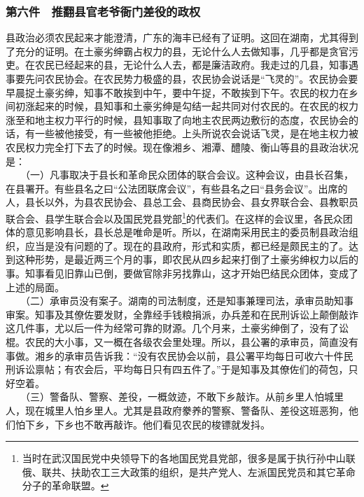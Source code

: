 \documentclass[cn,11pt,chinese]{elegantbook}
\def\myformat#1{\hfil\hfil #1}
\begin{document}
\subsubsection*{\myformat{第六件　推翻县官老爷衙门差役的政权}}
县政治必须农民起来才能澄清，广东的海丰已经有了证明。这回在湖南，尤其得到了充分的证明。在土豪劣绅霸占权力的县，无论什么人去做知事，几乎都是贪官污吏。在农民已经起来的县，无论什么人去，都是廉洁政府。我走过的几县，知事遇事要先问农民协会。在农民势力极盛的县，农民协会说话是“飞灵的”。农民协会要早晨捉土豪劣绅，知事不敢挨到中午，要中午捉，不敢挨到下午。农民的权力在乡间初涨起来的时候，县知事和土豪劣绅是勾结一起共同对付农民的。在农民的权力涨至和地主权力平行的时候，县知事取了向地主农民两边敷衍的态度，农民协会的话，有一些被他接受，有一些被他拒绝。上头所说农会说话飞灵，是在地主权力被农民权力完全打下去了的时候。现在像湘乡、湘潭、醴陵、衡山等县的县政治状况是：\\
　　（一）凡事取决于县长和革命民众团体的联合会议。这种会议，由县长召集，在县署开。有些县名之曰“公法团联席会议”，有些县名之曰“县务会议”。出席的人，县长以外，为县农民协会、县总工会、县商民协会、县女界联合会、县教职员联合会、县学生联合会以及国民党县党部\footnote[17]{ 当时在武汉国民党中央领导下的各地国民党县党部，很多是属于执行孙中山联俄、联共、扶助农工三大政策的组织，是共产党人、左派国民党员和其它革命分子的革命联盟。}的代表们。在这样的会议里，各民众团体的意见影响县长，县长总是唯命是听。所以，在湖南采用民主的委员制县政治组织，应当是没有问题的了。现在的县政府，形式和实质，都已经是颇民主的了。达到这种形势，是最近两三个月的事，即农民从四乡起来打倒了土豪劣绅权力以后的事。知事看见旧靠山已倒，要做官除非另找靠山，这才开始巴结民众团体，变成了上述的局面。\\
　　（二）承审员没有案子。湖南的司法制度，还是知事兼理司法，承审员助知事审案。知事及其僚佐要发财，全靠经手钱粮捐派，办兵差和在民刑诉讼上颠倒敲诈这几件事，尤以后一件为经常可靠的财源。几个月来，土豪劣绅倒了，没有了讼棍。农民的大小事，又一概在各级农会里处理。所以，县公署的承审员，简直没有事做。湘乡的承审员告诉我：“没有农民协会以前，县公署平均每日可收六十件民刑诉讼禀帖；有农会后，平均每日只有四五件了。”于是知事及其僚佐们的荷包，只好空着。\\
　　（三）警备队、警察、差役，一概敛迹，不敢下乡敲诈。从前乡里人怕城里人，现在城里人怕乡里人。尤其是县政府豢养的警察、警备队、差役这班恶狗，他们怕下乡，下乡也不敢再敲诈。他们看见农民的梭镖就发抖。\\
\end{document}
